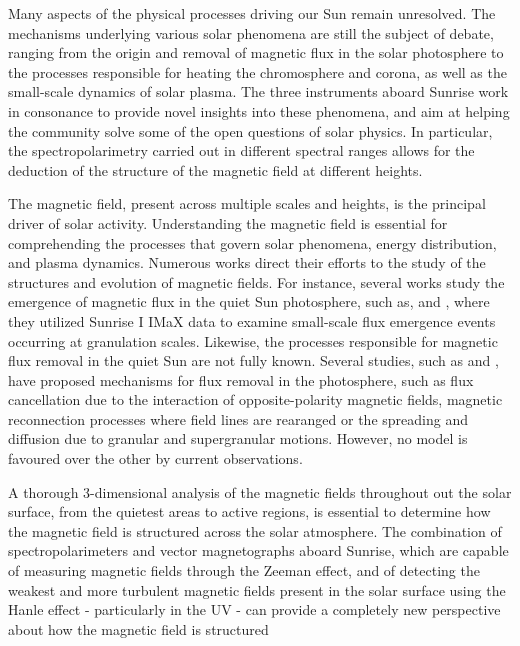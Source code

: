 Many aspects of the physical processes driving our Sun remain unresolved. The mechanisms underlying various solar phenomena are still the subject of debate, ranging from the origin and removal of magnetic flux in the solar photosphere to the processes responsible for heating the chromosphere and corona, as well as the small-scale dynamics of solar plasma. The three instruments aboard Sunrise work in consonance to provide novel insights into these phenomena, and aim at helping the community solve some of the open questions of solar physics. In particular, the spectropolarimetry carried out in different spectral ranges allows for the deduction of the structure of the magnetic field at different heights. 

The magnetic field, present across multiple scales and heights, is the principal driver of solar activity. Understanding the magnetic field is essential for comprehending the processes that govern solar phenomena, energy distribution, and plasma dynamics. Numerous works direct their efforts to the study of the structures and evolution of magnetic fields. For instance, several works study  the emergence of magnetic flux in the quiet Sun photosphere, such as, \cite{flux_emergence_1} and \cite{flux_emergence_2}, where they utilized Sunrise I IMaX data to examine small-scale flux emergence events occurring at granulation scales. Likewise, the processes responsible for magnetic flux removal in the quiet Sun are not fully known. Several studies, such as \cite{flux_removal_1} and \cite{flux_emergence_2}, have proposed mechanisms for flux removal in the photosphere, such as flux cancellation due to the interaction of opposite-polarity magnetic fields, magnetic reconnection processes where field lines are rearanged or the spreading and diffusion due to granular and supergranular motions. However, no model is favoured over the other by current observations.

A thorough 3-dimensional analysis of the magnetic fields throughout out the solar surface, from the quietest areas to active regions, is essential to determine how the magnetic field is structured across the solar atmosphere. The combination of spectropolarimeters and vector magnetographs aboard Sunrise, which are capable of measuring magnetic fields through the Zeeman effect, and of detecting the weakest and more turbulent \citep{quiet_sun_living_review} magnetic fields present in the solar surface using the Hanle effect - particularly in the UV - can provide a completely new perspective about how the magnetic field is structured 

